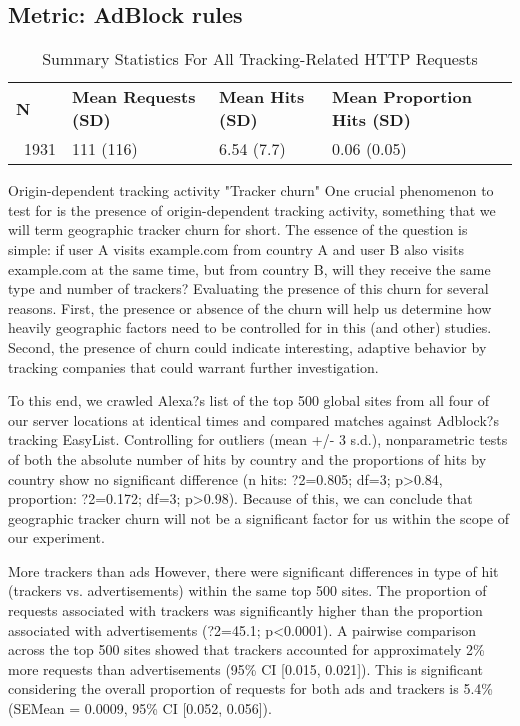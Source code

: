 \documentclass[journal]{IEEEtran}
\begin{document}
\subsection{Metric: AdBlock rules}

\begin{table}[t]
\centering
\caption{Summary Statistics For All Tracking-Related HTTP Requests}
\label{summaryTracking}
\begin{tabular}{|l|l|ll}
\textbf{N} & \textbf{Mean Requests (SD)} & \textbf{Mean Hits (SD)} & \textbf{Mean Proportion Hits (SD)} \\ \
1931       & 111 (116)                   & 6.54 (7.7)              & 0.06 (0.05)                        \\ 
\end{tabular}
\end{table}


Origin-dependent tracking activity 
"Tracker churn"
One crucial phenomenon to test for is the presence of origin-dependent tracking activity, something that we will term geographic tracker churn for short. The essence of the question is simple: if user A visits example.com from country A and user B also visits example.com at the same time, but from country B, will they receive the same type and number of trackers? Evaluating the presence of this churn for several reasons. First, the presence or absence of the churn will help us determine how heavily geographic factors need to be controlled for in this (and other) studies. Second, the presence of churn could indicate interesting, adaptive behavior by tracking companies that could warrant further investigation.

To this end, we crawled Alexa?s list of the top 500 global sites from all four of our server locations at identical times and compared matches against Adblock?s tracking EasyList. Controlling for outliers (mean +/- 3 s.d.), nonparametric tests of both the absolute number of hits by country and the proportions of hits by country show no significant difference (n hits: ?2=0.805; df=3; p>0.84, proportion: ?2=0.172; df=3; p>0.98). Because of this, we can conclude that geographic tracker churn will not be a significant factor for us within the scope of our experiment.

More trackers than ads 
However, there were significant differences in type of hit (trackers vs. advertisements) within the same top 500 sites. The proportion of requests associated with trackers was significantly higher than the proportion associated with advertisements (?2=45.1; p<0.0001). A pairwise comparison across the top 500 sites showed that trackers accounted for approximately 2\% more requests than advertisements (95\% CI [0.015, 0.021]). This is significant considering the overall proportion of requests for both ads and trackers is 5.4\% (SEMean = 0.0009, 95\% CI [0.052, 0.056]).
\end{document}
